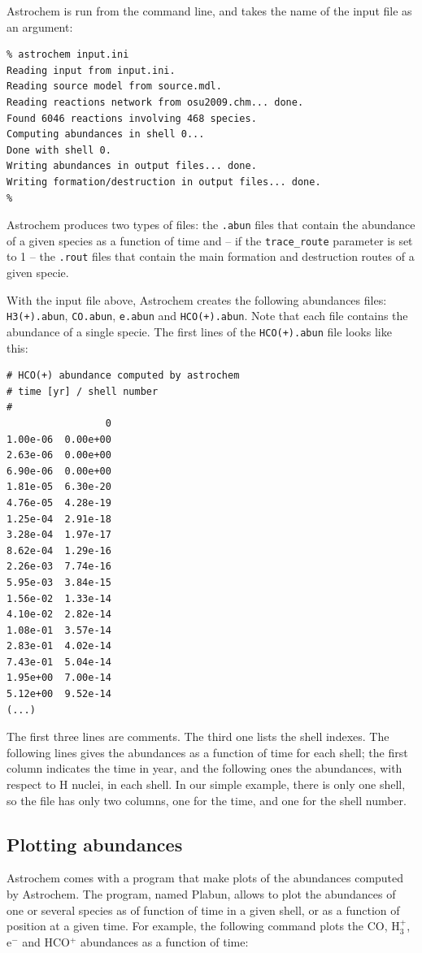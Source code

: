 \documentclass[a4paper,12pt]{article}
\begin{document}
Astrochem is run from the command line, and takes the name of the
input file as an argument:

\begin{verbatim}
% astrochem input.ini
Reading input from input.ini.
Reading source model from source.mdl.
Reading reactions network from osu2009.chm... done.
Found 6046 reactions involving 468 species.
Computing abundances in shell 0...
Done with shell 0.
Writing abundances in output files... done.
Writing formation/destruction in output files... done.
%
\end{verbatim}

Astrochem produces two types of files: the \verb=.abun= files that
contain the abundance of a given species as a function of time and --
if the \verb=trace_route= parameter is set to 1 -- the \verb=.rout=
files that contain the main formation and destruction routes of a
given specie.

With the input file above, Astrochem creates the following abundances
files: \verb=H3(+).abun=, \verb=CO.abun=, \verb=e.abun= and
\verb=HCO(+).abun=. Note that each file contains the abundance of a
single specie. The first lines of the \verb=HCO(+).abun= file looks
like this:

\begin{verbatim}
# HCO(+) abundance computed by astrochem
# time [yr] / shell number
#
                 0
1.00e-06  0.00e+00
2.63e-06  0.00e+00
6.90e-06  0.00e+00
1.81e-05  6.30e-20
4.76e-05  4.28e-19
1.25e-04  2.91e-18
3.28e-04  1.97e-17
8.62e-04  1.29e-16
2.26e-03  7.74e-16
5.95e-03  3.84e-15
1.56e-02  1.33e-14
4.10e-02  2.82e-14
1.08e-01  3.57e-14
2.83e-01  4.02e-14
7.43e-01  5.04e-14
1.95e+00  7.00e-14
5.12e+00  9.52e-14
(...)
\end{verbatim}

\noindent
The first three lines are comments. The third one lists the shell
indexes. The following lines gives the abundances as a function of
time for each shell; the first column indicates the time in year, and
the following ones the abundances, with respect to H nuclei, in each
shell. In our simple example, there is only one shell, so the file has
only two columns, one for the time, and one for the shell number.

\subsection{Plotting abundances}
\label{sec:plotting-abundances}

Astrochem comes with a program that make plots of the abundances
computed by Astrochem. The program, named Plabun, allows to plot the
abundances of one or several species as of function of time in a given
shell, or as a function of position at a given time. For example, the
following command plots the CO, H$_{3}^{+}$, e$^{-}$ and HCO$^{+}$
abundances as a function of time:
\end{document}
